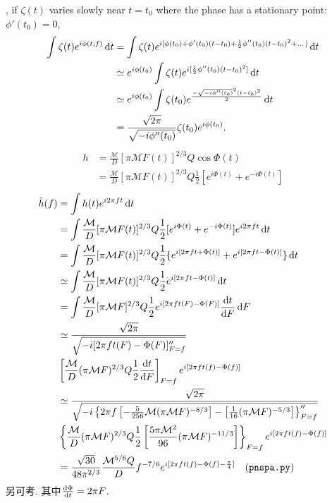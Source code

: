 \cite{Poisson1995}, if $\zeta(t)$ varies slowly near $t=t_0$ where the phase has a stationary point: $\phi'(t_0)=0$,
\begin{align}
    \int\zeta(t)e^{i\phi(t;f)}\,\mathrm{d} t&=\int\zeta(t)e^{i[\phi(t_0)+\phi'(t_0)(t-t_0)+\frac{1}{2}\phi''(t_0)(t-t_0)^2+\dots]}\,\mathrm{d} t\\
    &\simeq e^{i\phi(t_0)}\int\zeta(t)e^{i[\frac{1}{2}\phi''(t_0)(t-t_0)^2]}\,\mathrm{d} t\\
    &\simeq e^{i\phi(t_0)}\int\zeta(t_0)e^{\frac{-\sqrt{-i\phi''(t_0)}^2(t-t_0)^2}{2}}\,\mathrm{d} t\\
    &=\frac{\sqrt{2\pi}}{\sqrt{-i\phi''(t_0)}}\zeta(t_0)e^{i\phi(t_0)}.
\end{align}
\begin{align}
    h&=\frac{\mathcal{M}}{D}[\pi \mathcal{M}F(t)]^{2/3}Q\cos\Phi(t)\\
    &=\frac{\mathcal{M}}{D}[\pi \mathcal{M}F(t)]^{2/3}Q\frac{1}{2}[e^{i\Phi(t)}+e^{-i\Phi(t)}]
\end{align}
\begin{align}
    \tilde{h}(f)&=\int h(t)e^{i2\pi ft}\,\mathrm{d} t\\
    &=\int \frac{\mathcal{M}}{D}[\pi \mathcal{M}F(t)]^{2/3}Q\frac{1}{2}[e^{i\Phi(t)}+e^{-i\Phi(t)}]e^{i2\pi ft}\,\mathrm{d} t\\
    &=\int\frac{\mathcal{M}}{D}[\pi \mathcal{M}F(t)]^{2/3}Q\frac{1}{2}\{e^{i[2\pi ft+\Phi(t)]}+e^{i[2\pi ft-\Phi(t)]}\}\,\mathrm{d} t\\
    &\simeq\int\frac{\mathcal{M}}{D}[\pi \mathcal{M}F(t)]^{2/3}Q\frac{1}{2}e^{i[2\pi ft-\Phi(t)]}\,\mathrm{d} t\\
    &=\int\frac{\mathcal{M}}{D}[\pi \mathcal{M}F]^{2/3}Q\frac{1}{2}e^{i[2\pi ft(F)-\Phi(F)]}\frac{\mathrm{d} t}{\mathrm{d} F}\,\mathrm{d} F\\
    &\simeq\frac{\sqrt{2\pi}}{\sqrt{-i[2\pi ft(F)-\Phi(F)]''_{F=f}}}\\
    &\left[\frac{\mathcal{M}}{D}(\pi \mathcal{M}F)^{2/3}Q\frac{1}{2}\frac{\mathrm{d} t}{\mathrm{d} F}\right]_{F=f}e^{i[2\pi ft(f)-\Phi(f)]}\\
    &\simeq\frac{\sqrt{2\pi}}{\sqrt{-i\left\{2\pi f\left[-\frac{5}{256}\mathcal{M}(\pi \mathcal{M} F)^{-8/3}\right]-\left[\frac{1}{16}(\pi\mathcal{M} F)^{-5/3}\right]\right\}''_{F=f}}}\\
    &\left\{\frac{\mathcal{M}}{D}(\pi \mathcal{M}F)^{2/3}Q\frac{1}{2}\left[\frac{5\pi\mathcal{M}^2}{96}(\pi\mathcal{M} F)^{-11/3}\right]\right\}_{F=f}e^{i[2\pi ft(f)-\Phi(f)]}\\
    &=\frac{\sqrt{30}}{48\pi^{2/3}}\frac{\mathcal{M}^{5/6}Q}{D}f^{-7/6}e^{i[2\pi ft(f)-\Phi(f)-\frac{\pi}{4}]}\quad(\texttt{pnspa.py})
\end{align}
另可考\cite{Arun2005}. 其中$\frac{\mathrm{d} \Phi}{\mathrm{d} t}=2\pi F$.
